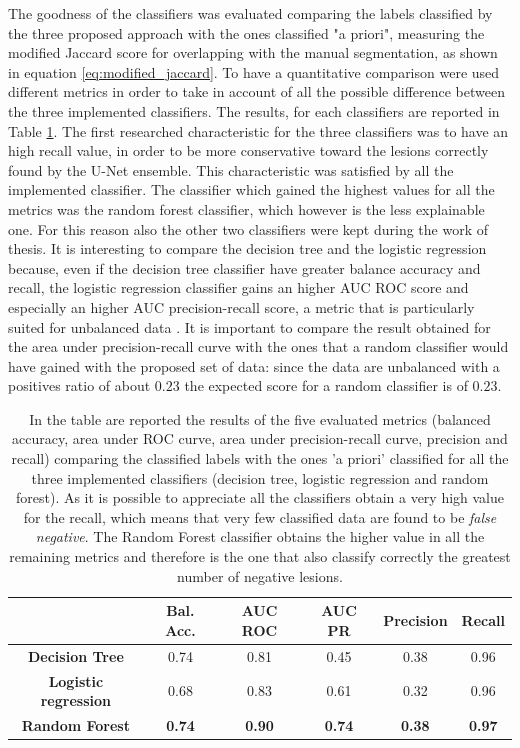 \documentclass{standalone}
\begin{document}
The goodness of the classifiers was evaluated comparing the labels classified by the three proposed approach with the ones classified "a priori", measuring the modified Jaccard score for overlapping with the manual segmentation, as shown in equation \ref{eq:modified_jaccard}.
To have a quantitative comparison were used different metrics in order to take in account of all the possible difference between the three implemented classifiers. The results, for each classifiers are reported in Table \ref{tab:postprocessing_metrics}.
The first researched characteristic for the three classifiers was to have an high recall value, in order to be more conservative toward the lesions correctly found by the U-Net ensemble. This characteristic was satisfied by all the implemented classifier.
The classifier which gained the highest values for all the metrics was the random forest classifier, which however is the less explainable one. For this reason also the other two classifiers were kept during the work of thesis.
It is interesting to compare the decision tree and the logistic regression because, even if the decision tree classifier have greater balance accuracy and recall, the logistic regression classifier gains an higher AUC ROC score and especially an higher AUC precision-recall score, a metric that is particularly suited for unbalanced data \cite{ART:AUCPR}.
It is important to compare the result obtained for the area under precision-recall curve with the ones that a random classifier would have gained with the proposed set of data: since the data are unbalanced with a positives ratio of about $0.23$ the expected score for a random classifier is of $0.23$.

\begin{table}[h!]
\small
\begin{tabular}{c|ccccc}
 & \textbf{Bal. Acc.} & \textbf{AUC ROC} & \textbf{AUC PR} & \textbf{Precision} & \textbf{Recall} \\ \hline
\textbf{Decision Tree}       & 0.74 & 0.81 & 0.45 & 0.38 & 0.96 \\
\textbf{Logistic regression} & 0.68 & 0.83 & 0.61 & 0.32 & 0.96 \\
\textbf{Random Forest}       & \textbf{0.74} & \textbf{0.90} & \textbf{0.74} & \textbf{0.38} & \textbf{0.97}
\end{tabular}
\caption{In the table are reported the results of the five evaluated metrics (balanced accuracy, area under ROC curve, area under precision-recall curve, precision and recall) comparing the classified labels with the ones 'a priori' classified for all the three implemented classifiers (decision tree, logistic regression and random forest).
As it is possible to appreciate all the classifiers obtain a very high value for the recall, which means that very few classified data are found to be \emph{false negative}.
The Random Forest classifier obtains the higher value in all the remaining metrics and therefore is the one that also classify correctly the greatest number of negative lesions.}
\label{tab:postprocessing_metrics}
\end{table}
\end{document}
